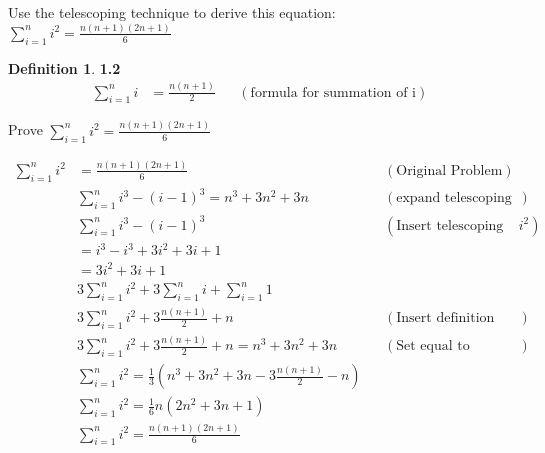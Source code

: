 \documentclass[10pt]{article}
\newenvironment{exercise}[2][Exercise]{\begin{trivlist}
\item[\hskip \labelsep {\bfseries #1}\hskip \labelsep {\bfseries #2.}]}{\end{trivlist}}
\newenvironment{solution}[2][Solution]{\begin{trivlist}
\item[\hskip \labelsep {\bfseries #1}\hskip \labelsep {\bfseries #2.}]}{\end{trivlist}}
\theoremstyle{definition}
\newtheorem*{defn*}{Definition}
\begin{document}
\begin{exercise}{(5)} %
Use the telescoping technique to derive this equation:\\
$\displaystyle \sum_{i=1}^{n}i^2  = \frac{n(n+1)(2n+1)}{6}$\\

\end{exercise}

\begin{defn*}{\textbf {1.2}}
\begin{align*}
\sum_{i=1}^{n}i  & = \frac{n(n+1)}{2} && (\text{formula for summation of i})
\end{align*}
\end{defn*}

\begin{solution}{(5)}
Prove $\displaystyle \sum_{i=1}^{n}i^2  = \frac{n(n+1)(2n+1)}{6}$
\end{solution}

\begin{align*}
\sum_{i=1}^{n}i^2  & = \frac{n(n+1)(2n+1)}{6} && (\text{Original Problem}) \\
& \sum_{i=1}^{n}i^3 - (i -1)^3 = n^3 + 3n^2 + 3n && (\text{expand telescoping sum})\\
& \sum_{i=1}^{n}i^3 - (i -1)^3 && (\text{Insert telescoping sum for $i^2$}) \\
& = i^3 - i^3 + 3i^2 + 3i + 1 \\
& = 3i^2 + 3i + 1\\
& 3\sum_{i=1}^{n}i^2 + 3\sum_{i=1}^{n}i + \sum_{i=1}^{n}1 \\
& 3\sum_{i=1}^{n}i^2 + 3\frac{n(n+1)}{2} + n && (\text{Insert definition 1.2, sum of 1 goes to n})\\
& 3\sum_{i=1}^{n}i^2 + 3\frac{n(n+1)}{2} + n = n^3 + 3n^2 + 3n && (\text{Set equal to expanded summation})\\
& \sum_{i=1}^{n}i^2 = \frac{1}{3}(n^3 + 3n^2 + 3n - 3\frac{n(n+1)}{2} - n)\\
& \sum_{i=1}^{n}i^2 = \frac{1}{6}n(2n^2 + 3n + 1) \\
& \sum_{i=1}^{n}i^2 = \frac{n(n+1)(2n+1)}{6}
\end{align*}



 
\end{document}
